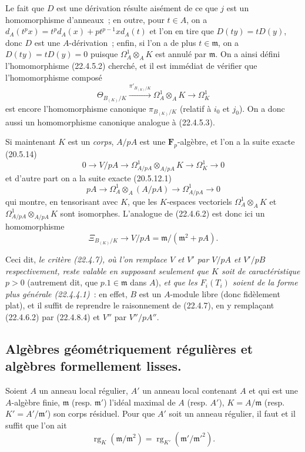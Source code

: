 \begin{remark}[22.4.8]
Le fait que $D$ est une dérivation résulte aisément de ce que $j$ est un
homomorphisme d'anneaux~; en outre, pour $t\in A$, on a
$d_A(t^px)=t^p d_A(x)+pt^{p-1}x d_A(t)$ et l'on en tire que
$D(ty)=tD(y)$, donc $D$ est une $A$-dérivation~; enfin, si l'on a de plus
$t\in\mathfrak m$, on a
$D(ty)=tD(y)=0$ puisque $\Omega^1_A\otimes_AK$ est annulé par $\mathfrak m$.
On a ainsi défini l'homomorphisme (22.4.5.2) cherché, et il est immédiat de
vérifier que l'homomorphisme composé
\[
  \Theta_{B_{(K)}/K}\xrightarrow{\pi'_{B_{(K)}/K}}
  \Omega^1_A\otimes_AK\longrightarrow\Omega^1_K
\]
est encore l'homomorphisme canonique $\pi_{B_{(K)}/K}$ (relatif à $i_0$ et
$j_0$). On a donc aussi un homomorphisme canonique analogue à (22.4.5.3).

Si maintenant $K$ est un \emph{corps}, $A/pA$ est une $\mathbf F_p$-algèbre,
et l'on a la suite exacte (20.5.14)
\[
  0\longrightarrow V/pA\longrightarrow
  \Omega^1_{A/pA}\otimes_{A/pA}K\longrightarrow\Omega^1_K\longrightarrow0
\]
et d'autre part on a la suite exacte (20.5.12.1)
\[
  pA\longrightarrow\Omega^1_A\otimes_A(A/pA)
  \longrightarrow\Omega^1_{A/pA}\longrightarrow0
\]
qui montre, en tensorisant avec $K$, que les $K$-espaces vectoriels
$\Omega^1_A\otimes_AK$ et
$\Omega^1_{A/pA}\otimes_{A/pA}K$ sont isomorphes. L'analogue de (22.4.6.2) est
donc ici un homomorphisme
\begin{equation}
\label{0.22.4.8.4-fr}
  \Xi_{B_{(K)}/K}\longrightarrow V/pA=\mathfrak m/(\mathfrak m^2+pA).
  \tag{22.4.8.4}
\end{equation}

Ceci dit, \emph{le critère \textup{(22.4.7)}, où l'on remplace $V$ et $V'$ par $V/pA$
et $V'/pB$ respectivement, reste valable en supposant seulement que $K$ soit
de caractéristique $p>0$} (autrement dit, que $p.1\in\mathfrak m$ dans
$A$), \emph{et que les $F_i(T_i)$ soient de la forme plus générale
\textup{(22.4.4.1)}}~: en effet, $B$ est un $A$-module libre (donc fidèlement plat), et
il suffit de reprendre le raisonnement de (22.4.7), en y remplaçant (22.4.6.2)
par (22.4.8.4) et $V''$ par $V''/pA''$.
\end{remark}

\subsection{Algèbres géométriquement régulières et algèbres formellement lisses.}
\label{subsection:0.22.5-fr}

\begin{proposition}[22.5.1]
\label{0.22.5.1-fr}
Soient $A$ un anneau local régulier, $A'$ un anneau local contenant $A$ et qui
est une $A$-algèbre finie, $\mathfrak m$ \textup{(resp. $\mathfrak m'$)} l'idéal maximal
de $A$ \textup{(resp. $A'$)}, $K=A/\mathfrak m$ \textup{(resp. $K'=A'/\mathfrak m'$)} son corps
résiduel. Pour que $A'$ soit un anneau régulier, il faut et il suffit que l'on
ait
\begin{equation}
\label{0.22.5.1.1-fr}
  \operatorname{rg}_K(\mathfrak m/\mathfrak m^2)
  =\operatorname{rg}_{K'}(\mathfrak m'/\mathfrak m'^2).
  \tag{22.5.1.1}
\end{equation}
\end{proposition}

